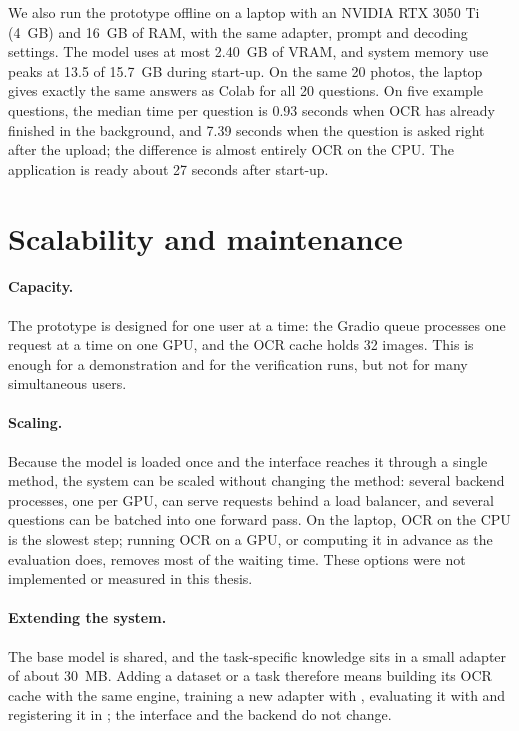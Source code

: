 We also run the prototype offline on a laptop with an NVIDIA RTX 3050 Ti (4~GB) and 16~GB
of RAM, with the same adapter, prompt and decoding settings. The model uses at most
2.40~GB of VRAM, and system memory use peaks at 13.5 of 15.7~GB during start-up. On the
same 20 photos, the laptop gives exactly the same answers as Colab for all 20 questions.
On five example questions, the median time per question is 0.93 seconds when OCR has
already finished in the background, and 7.39 seconds when the question is asked right after
the upload; the difference is almost entirely OCR on the CPU. The application is ready
about 27 seconds after start-up.

\section{Scalability and maintenance}
\label{sec:sd-scale}

\paragraph{Capacity.} The prototype is designed for one user at a time: the Gradio queue
processes one request at a time on one GPU, and the OCR cache holds 32 images. This is
enough for a demonstration and for the verification runs, but not for many simultaneous
users.

\paragraph{Scaling.} Because the model is loaded once and the interface reaches it through a
single method, the system can be scaled without changing the method: several backend
processes, one per GPU, can serve requests behind a load balancer, and several questions can
be batched into one forward pass. On the laptop, OCR on the CPU is the slowest step; running
OCR on a GPU, or computing it in advance as the evaluation does, removes most of the waiting
time. These options were not implemented or measured in this thesis.

\paragraph{Extending the system.} The base model is shared, and the task-specific knowledge
sits in a small adapter of about 30~MB. Adding a dataset or a task therefore means building
its OCR cache with the same engine, training a new adapter with
, evaluating it with  and
registering it in ; the interface and the backend do not
change.

